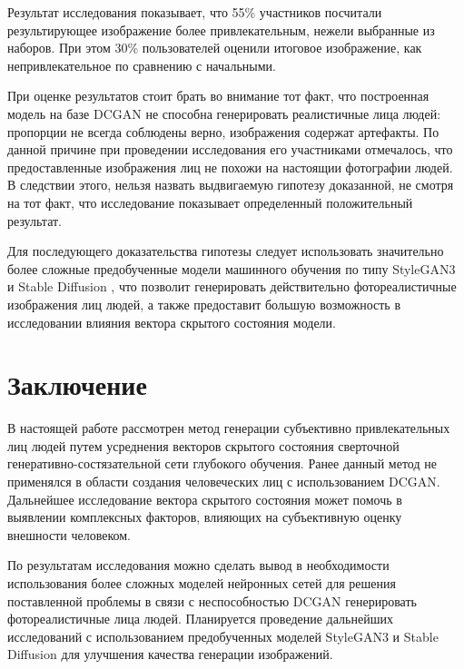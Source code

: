 \documentclass[60x84/16,8pt]{ittmm}
\begin{document}
Результат исследования показывает, что 55\% участников посчитали результирующее
изображение более привлекательным, нежели выбранные из наборов.
При этом 30\% пользователей оценили итоговое изображение, как
непривлекательное по сравнению с начальными.

При оценке результатов стоит брать во внимание тот факт, что
построенная модель на базе DCGAN не способна генерировать
реалистичные лица людей: пропорции не всегда соблюдены верно,
изображения содержат артефакты. По данной причине при проведении
исследования его участниками отмечалось, что предоставленные изображения
лиц не похожи на настоящии фотографии людей. В следствии этого,
нельзя назвать выдвигаемую гипотезу доказанной, не смотря на тот факт,
что исследование показывает определенный положительный результат.

Для последующего доказательства гипотезы следует использовать
значительно более сложные предобученные модели машинного обучения
по типу StyleGAN3 \cite{stylegan} и Stable Diffusion \cite{sd}, что позволит генерировать
действительно фотореалистичные изображения лиц людей, а также
предоставит большую возможность в исследовании влияния вектора скрытого
состояния модели.

\section{Заключение}

В настоящей работе рассмотрен метод генерации субъективно привлекательных лиц людей
путем усреднения векторов скрытого состояния сверточной
генеративно-состязательной сети глубокого обучения. Ранее данный
метод не применялся в области создания человеческих лиц с
использованием DCGAN. Дальнейшее исследование вектора скрытого состояния
может помочь в выявлении комплексных факторов, влияющих на субъективную
оценку внешности человеком.

По результатам исследования можно сделать вывод в необходимости
использования более сложных моделей нейронных сетей для решения
поставленной проблемы в связи с неспособностью DCGAN генерировать
фотореалистичные лица людей. Планируется проведение дальнейших исследований
с использованием предобученных моделей StyleGAN3 и Stable Diffusion
для улучшения качества генерации изображений.
\end{document}
